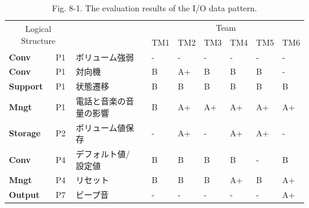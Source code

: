 \documentclass[a4paper,12pt]{jreport}
\begin{document}
\begin{table}[htbp]
  \centering
  \caption{Fig. 8-1. The evaluation results of the I/O data pattern.}
    \begin{tabular}{|l|l|l|r|l|l|l|l|l|l|}
    \hline
    \multicolumn{2}{|c}{\multirow{2}[4]{*}{Logical
Structure}} & \multicolumn{1}{r}{} &       & \multicolumn{6}{c|}{Team} \bigstrut\\
\cline{5-10}    \multicolumn{2}{|c}{} & \multicolumn{1}{r}{} &       & TM1   & TM2   & TM3   & TM4   & TM5   & TM6 \bigstrut\\
    \hline
    \textbf{Conv} & P1    & ボリューム強弱 &       & -     & -     & -     & -     & -     & - \bigstrut\\
    \hline
    \textbf{Conv} & P1    & 対向機   &       & B     & A+    & B     & B     & B     & - \bigstrut\\
    \hline
    \textbf{Support} & P1    & 状態遷移  &       & B     & B     & B     & B     & B     & B \bigstrut\\
    \hline
    \textbf{Mngt} & P1    & 電話と音楽の音量の影響 &       & B     & A+    & A+    & A+    & A+    & A+ \bigstrut\\
    \hline
    \textbf{Storage} & P2    & ボリューム値保存 &       & -     & A+    & -     & A+    & A+    & - \bigstrut\\
    \hline
    \textbf{Conv} & P4    & デフォルト値/設定値 &       & B     & B     & B     & B     & -     & B \bigstrut\\
    \hline
    \textbf{Mngt} & P4    & リセット  &       & B     & B     & B     & A+    & B     & A+ \bigstrut\\
    \hline
    \textbf{Output} & P7    & ビープ音  &       & -     & -     & -     & -     & -     & A+ \bigstrut\\
    \hline
    \end{tabular}%
  \label{tbl:D-3-tbl7}%
\end{table}%
\end{document}
